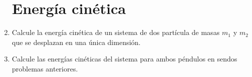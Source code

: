 \documentclass[11pt, spanish, a4paper, twoside]{article}
\begin{document}
\begin{enumerate}
	\section*{Energía cinética}
	\item
		Calcule la energía cinética de un sistema de dos partícula de masas \(m_1\) y \(m_2\)  que se desplazan en una única dimensión.


	\item
		Calcule las energías cinéticas del sistema para ambos péndulos en sendos problemas anteriores.


\end{enumerate}
\end{document}

